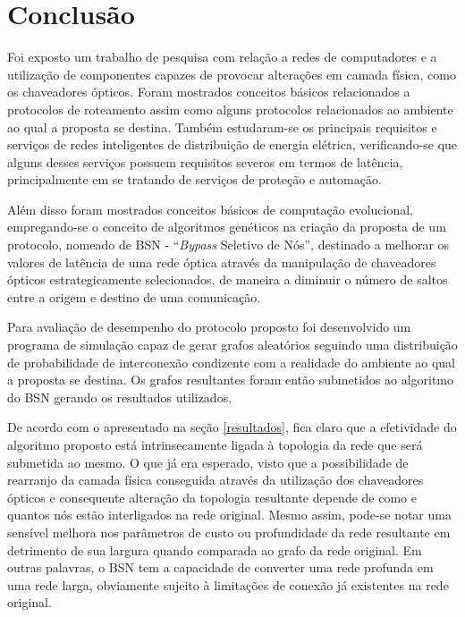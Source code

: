 \chapter{Conclusão}

Foi exposto um trabalho de pesquisa com relação a redes de computadores e a utilização de componentes capazes de provocar alterações em camada física, como os chaveadores ópticos. Foram mostrados conceitos básicos relacionados a protocolos de roteamento assim como alguns protocolos relacionados ao ambiente ao qual a proposta se destina. Também estudaram-se os principais requisitos e serviços de redes inteligentes de distribuição de energia elétrica, verificando-se que alguns desses serviços possuem requisitos severos em termos de latência, principalmente em se tratando de serviços de proteção e automação.

Além disso foram mostrados conceitos básicos de computação evolucional, empregando-se o conceito de algoritmos genéticos na criação da proposta de um protocolo, nomeado de BSN - ``\emph{Bypass} Seletivo de Nós'', destinado a melhorar os valores de latência de uma rede óptica através da manipulação de chaveadores ópticos estrategicamente selecionados, de maneira a diminuir o número de saltos entre a origem e destino de uma comunicação.

Para avaliação de desempenho do protocolo proposto foi desenvolvido um programa de simulação capaz de gerar grafos aleatórios seguindo uma distribuição de probabilidade de interconexão condizente com a realidade do ambiente ao qual a proposta se destina. Os grafos resultantes foram então submetidos ao algoritmo do BSN gerando os resultados utilizados.

De acordo com o apresentado na seção \ref{resultados}, fica claro que a efetividade do algoritmo proposto está intrinsecamente ligada à topologia da rede que será submetida ao mesmo. O que já era esperado, visto que a possibilidade de rearranjo da camada física conseguida através da utilização dos chaveadores ópticos e consequente alteração da topologia resultante depende de como e quantos nós estão interligados na rede original. Mesmo assim, pode-se notar uma sensível melhora nos parâmetros de custo ou profundidade da rede resultante em detrimento de sua largura quando comparada ao grafo da rede original. Em outras palavras, o BSN tem a capacidade de converter uma rede profunda em uma rede larga, obviamente sujeito à limitações de conexão já existentes na rede original.


